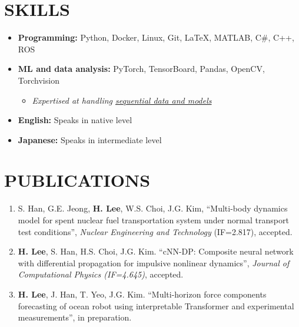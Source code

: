 \documentclass[a4paper,10pt]{extarticle}
\begin{document}
\section*{SKILLS}
\begin{itemize}
    \item \textbf{Programming: }Python, Docker, Linux, Git, \LaTeX, MATLAB, C\#, C++, ROS
    \item \textbf{ML and data analysis:} PyTorch, TensorBoard, Pandas, OpenCV, Torchvision
          \begin{itemize}
              \item \textit{Expertised at handling \underline{sequential data and models}}
          \end{itemize}
    \item \textbf{English: }Speaks in native level
    \item \textbf{Japanese: }Speaks in intermediate level
\end{itemize}


\section*{PUBLICATIONS}
\noindent
\begin{enumerate}[leftmargin=.5cm]
    \item S. Han, G.E. Jeong, \textbf{H. Lee}, W.S. Choi, J.G. Kim, “Multi-body dynamics model for spent nuclear fuel transportation system under normal transport test conditions”, \textit{Nuclear Engineering and Technology} (IF=2.817), accepted.
    \item \textbf{H. Lee}, S. Han, H.S. Choi, J.G. Kim. “cNN-DP: Composite neural network with differential propagation for impulsive nonlinear dynamics”, \textit{Journal of Computational Physics (IF=4.645)}, accepted.
    \item \textbf{H. Lee}, J. Han, T. Yeo, J.G. Kim. “Multi-horizon force components forecasting of ocean robot using interpretable Transformer and experimental measurements”, in preparation.
\end{enumerate}

\end{document}
